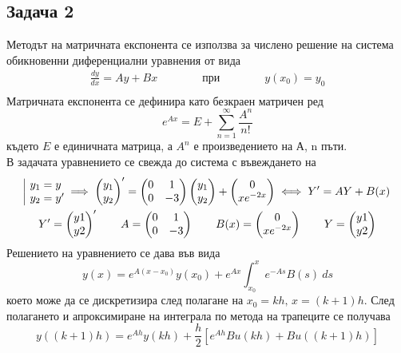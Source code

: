 \documentclass[a4paper,fleqn,12pt]{article}
\begin{document}
\subsection{Задача 2}
Методът на матричната експонента се използва за числено решение на система обикновенни диференциални уравнения от вида 
	\begin{gather*}
		\frac{dy}{dx} = Ay + Bx
		\qquad \qquad  \text{при} \qquad \qquad 
      		y(x_0)=y_0 \\
	\end{gather*}
Матричната експонента се дефинира като безкраен матричен ред
\begin{equation*}
	e^{Ax} = E + \sum_{n=1} ^{\infty} \frac{A^n}{n!}
\end{equation*}
където $E$ е единичната матрица, а $A^n$ е произведението на А, n пъти.\\
В задачата уравнението се свежда до система с въвеждането на 
	\begin{gather*}
		\begin{array}{|l@{}}
			y_1=y\\
			y_2=y'
		\end{array} \implies 
		\begin{pmatrix} y_1 \\ y_2 \end{pmatrix}' = 
		\begin{pmatrix} 0 & 1 \\ 0 & -3 \end{pmatrix} 
		\begin{pmatrix} y_1 \\ y_2 \end{pmatrix} + 
		\begin{pmatrix} 0 \\ xe^{-2x} \end{pmatrix} \iff Y'=AY+B(x)\\ 
		Y'=\begin{pmatrix} y1 \\ y2 \end{pmatrix}' \qquad 
		A=\begin{pmatrix} 0 & 1 \\ 0 & -3 \end{pmatrix} \qquad 
		B(x)=\begin{pmatrix} 0 \\ xe^{-2x} \end{pmatrix} \qquad
		Y=\begin{pmatrix} y1 \\ y2 \end{pmatrix}
	\end{gather*}
Решението на уравнението се дава във вида
\begin{equation*}
	y(x)=e^{A(x-x_0)} y(x_0) + e^{Ax} \int_{x_0} ^{x} e^{-As} B(s) \ ds
\end{equation*}
което може да се дискретизира след полагане на $x_0 = kh, \, x = (k+1)h$. След полагането и апроксимиране на 
интеграла по метода на трапеците се получава
\begin{equation*}
	y((k+1)h)= e^{Ah}y(kh) + \frac{h}{2} \left[ e^{Ah}Bu(kh) + Bu((k+1)h) \right]
\end{equation*}
\end{document}
